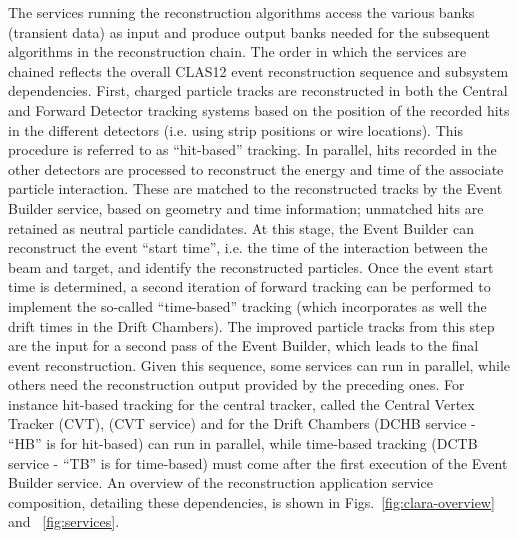 The services running the reconstruction algorithms access the various banks (transient data) as input and produce
output banks needed for the subsequent algorithms in the reconstruction chain. The order in which the services are
chained reflects the overall CLAS12 event reconstruction sequence and subsystem dependencies. First, charged
particle tracks are reconstructed in both the Central and Forward Detector tracking systems based on the position
of the recorded hits in the different detectors (i.e. using strip positions or wire locations). This procedure is
referred to as ``hit-based'' tracking. In parallel, hits recorded in the other detectors are processed to reconstruct
the energy and time of the associate particle interaction. These are matched to the reconstructed tracks by the
Event Builder service, based on geometry and time information; unmatched hits are retained as neutral particle
candidates. At this stage, the Event Builder can reconstruct the event ``start time'', i.e. the time of the interaction
between the beam and target, and identify the reconstructed particles. Once the event start time is determined, a
second iteration of forward tracking can be performed to implement the so-called ``time-based'' tracking (which
incorporates as well the drift times in the Drift Chambers). The improved particle tracks from this step are the input
for a second pass of the Event Builder, which leads to the final event reconstruction. Given this sequence, some
services can run in parallel, while others need the reconstruction output provided by the preceding ones. For instance
hit-based tracking for the central tracker, called the Central Vertex Tracker (CVT), (CVT service) and for the
Drift Chambers (DCHB service - ``HB'' is for hit-based) can run in parallel, while time-based tracking
(DCTB service - ``TB'' is for time-based) must come after the first execution of the Event Builder service. An
overview of the reconstruction application service composition, detailing these dependencies, is shown in
Figs.~\ref{fig:clara-overview} and ~\ref{fig:services}.
